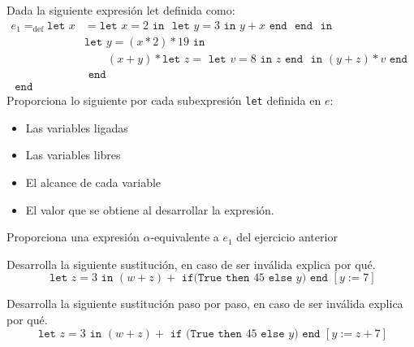     \begin{exercise}
        Dada la siguiente expresión let definida como:
        \begin{align*}
        	e_1=_{\text{def}}\texttt{let  }
        		x&= \texttt{let }x = 2 \texttt{ in } \texttt{ let } y = 3 \texttt{ in } y + x \texttt{ end } \texttt{ end }
        		\texttt{ in }\\
        		 &\texttt{let }y=(x \ast 2) \ast 19 
        		 	\texttt{ in } \\
        		 & \qquad(x + y) \ast \texttt{let } z = \texttt{ let } v = 8 \texttt{ in } z \texttt{ end } \texttt{ in } 
        		 						(y + z) \ast v 
        		 				\texttt{ end }\\
        		 &\texttt{ end }\\
        	\texttt{ end }&
        \end{align*}
        Proporciona lo siguiente por cada subexpresión \texttt{let} definida en $e$:
        \begin{itemize}
            \item Las variables ligadas
            \item Las variables libres
            \item El alcance de cada variable
            \item El valor que se obtiene al desarrollar la expresión.
        \end{itemize}
    \end{exercise}

    \bigskip
    
    \begin{exercise}
        Proporciona una expresión $\alpha$-equivalente a $e_1$ del ejercicio anterior 
    \end{exercise}

    \bigskip
    
    
    \begin{exercise}
         Desarrolla la siguiente sustitución, en caso de ser inválida explica por qué.
         \[
         \texttt{ let } z = 3 \texttt{ in } (w + z) + \texttt{ if(} \texttt{True} \texttt{ then } 45 \texttt{ else } y \texttt{) } \texttt{end } [y:=7]
         \]
    \end{exercise}

    \bigskip
    
    \begin{exercise}
        Desarrolla la siguiente sustitución paso por paso, en caso de ser inválida explica por qué. 
        \[
            \texttt{ let } z = 3 \texttt{ in } (w + z) + \texttt{ if (} \texttt{True} \texttt{ then } 45 \texttt{ else } y \texttt{)} \texttt{ end } [y:=z+7]
        \]
    \end{exercise}

